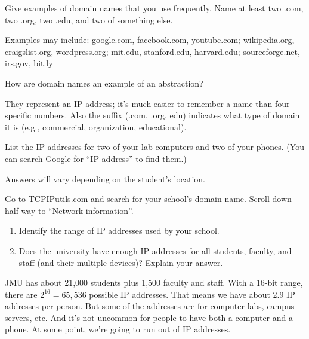 \Q Give examples of domain names that you use frequently.
Name at least two .com, two .org, two .edu, and two of something else.

\begin{answer}[5em]
Examples may include:
google.com, facebook.com, youtube.com;
wikipedia.org, craigslist.org, wordpress.org;
mit.edu, stanford.edu, harvard.edu;
sourceforge.net, irs.gov, bit.ly
\end{answer}


\Q How are domain names an example of an abstraction?

\begin{answer}[5em]
They represent an IP address; it's much easier to remember a name than four specific numbers.
Also the suffix (.com, .org. edu) indicates what type of domain it is (e.g., commercial, organization, educational).
\end{answer}


\Q List the IP addresses for two of your lab computers and two of your phones.
(You can search Google for ``IP address'' to find them.)

\begin{answer}[5em]
Answers will vary depending on the student's location.
\end{answer}


\Q Go to \href{http://www.tcpiputils.com/}{TCPIPutils.com} and search for your school's domain name.
Scroll down half-way to ``Network information''.
\begin{enumerate}
\item Identify the range of IP addresses used by your school. 
\item Does the university have enough IP addresses for all students, faculty, and staff (and their multiple devices)? Explain your answer.
\end{enumerate}

\vspace{-1em}

\begin{answer}[5em]
JMU has about 21,000 students plus 1,500 faculty and staff.
With a 16-bit range, there are $2^{16} = 65,536$ possible IP addresses.
That means we have about 2.9 IP addresses per person.
But some of the addresses are for computer labs, campus servers, etc.
And it's not uncommon for people to have both a computer and a phone.
At some point, we're going to run out of IP addresses.
\end{answer}
